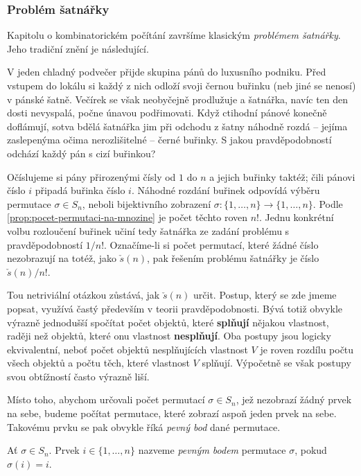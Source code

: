 \subsubsection{Problém šatnářky}
\label{sssec:problem-satnarky}

Kapitolu o kombinatorickém počítání završíme klasickým \emph{problémem
šatnářky}. Jeho tradiční znění je následující.

V jeden chladný podvečer přijde skupina pánů do luxusního podniku. Před vstupem
do lokálu si každý z nich odloží svoji černou buřinku (neb jiné se nenosí) v
pánské šatně. Večírek se však neobyčejně prodlužuje a šatnářka, navíc ten den
dosti nevyspalá, počne únavou podřimovati. Když ctihodní pánové konečně
doflámují, sotva bdělá šatnářka jim při odchodu z šatny náhodně rozdá -- jejíma
zaslepenýma očima nerozlišitelné -- černé buřinky. S jakou pravděpodobností
odchází každý pán s cizí buřinkou?

Očíslujeme si pány přirozenými čísly od $1$ do $n$ a jejich buřinky taktéž; čili
pánovi číslo $i$ připadá buřinka číslo $i$. Náhodné rozdání buřinek odpovídá
výběru permutace $\sigma \in S_n$, neboli bijektivního zobrazení  $\sigma:
\{1,\ldots,n\} \to \{1,\ldots,n\}$. Podle \cref{prop:pocet-permutaci-na-mnozine}
je počet těchto roven $n!$. Jednu konkrétní volbu rozloučení buřinek učiní tedy
šatnářka ze zadání problému s pravděpodobností $1 / n!$. Označíme-li si počet
permutací, které žádné číslo nezobrazují na totéž, jako  $\check{s}(n)$, pak
řešením problému šatnářky je číslo $\check{s}(n) / n!$.

Tou netriviální otázkou zůstává, jak $\check{s}(n)$ určit. Postup, který se zde
jmeme popsat, využívá  častý především v teorii pravděpodobnosti. Bývá
totiž obvykle výrazně jednodušší spočítat počet objektů, které \textbf{splňují}
nějakou vlastnost, raději než objektů, které onu vlastnost \textbf{nesplňují}.
Oba postupy jsou logicky ekvivalentní, neboť počet objektů nesplňujících
vlastnost $V$ je roven rozdílu počtu všech objektů a počtu těch, které vlastnost
$V$ splňují. Výpočetně se však postupy svou obtížností často výrazně liší.

Místo toho, abychom určovali počet permutací $\sigma \in S_n$, jež nezobrazí
žádný prvek na sebe, budeme počítat permutace, které zobrazí aspoň jeden prvek
na sebe. Takovému prvku se pak obvykle říká \emph{pevný bod} dané permutace.

\begin{definition}
 \label{def:pevny-bod}
 Ať $\sigma \in S_n$. Prvek $i  \in \{1,\ldots,n\}$ nazveme \emph{pevným bodem}
 permutace $\sigma$, pokud $\sigma(i) = i$.
\end{definition}

